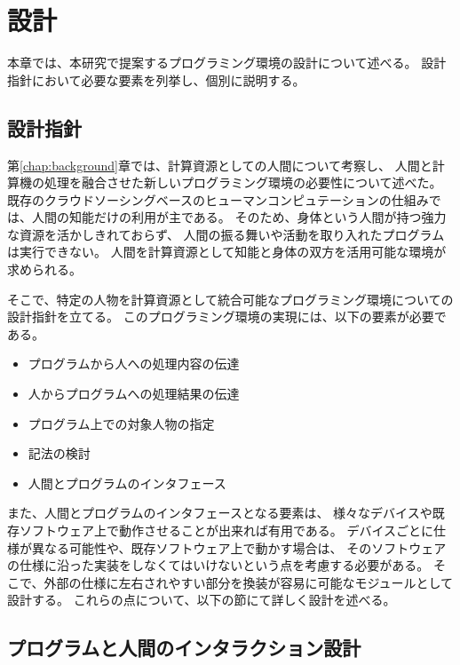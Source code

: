 \chapter{設計}\label{chap:design}

本章では、本研究で提案するプログラミング環境の設計について述べる。
設計指針において必要な要素を列挙し、個別に説明する。

\newpage

\section{設計指針}\label{ux8a2dux8a08ux6307ux91dd}

第\ref{chap:background}章では、計算資源としての人間について考察し、
人間と計算機の処理を融合させた新しいプログラミング環境の必要性について述べた。
既存のクラウドソーシングベースのヒューマンコンピュテーションの仕組みでは、人間の知能だけの利用が主である。
そのため、身体という人間が持つ強力な資源を活かしきれておらず、
人間の振る舞いや活動を取り入れたプログラムは実行できない。
人間を計算資源として知能と身体の双方を活用可能な環境が求められる。

そこで、特定の人物を計算資源として統合可能なプログラミング環境についての設計指針を立てる。
このプログラミング環境の実現には、以下の要素が必要である。

\begin{itemize}
\itemsep1pt\parskip0pt
\item
  プログラムから人への処理内容の伝達
\item
  人からプログラムへの処理結果の伝達
\item
  プログラム上での対象人物の指定
\item
  記法の検討
\item
  人間とプログラムのインタフェース
\end{itemize}

また、人間とプログラムのインタフェースとなる要素は、
様々なデバイスや既存ソフトウェア上で動作させることが出来れば有用である。
デバイスごとに仕様が異なる可能性や、既存ソフトウェア上で動かす場合は、
そのソフトウェアの仕様に沿った実装をしなくてはいけないという点を考慮する必要がある。
そこで、外部の仕様に左右されやすい部分を換装が容易に可能なモジュールとして設計する。
これらの点について、以下の節にて詳しく設計を述べる。

\section{プログラムと人間のインタラクション設計}\label{sec:program-human-interaction-design}


